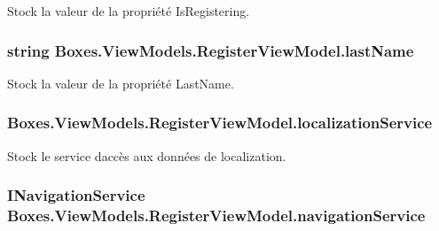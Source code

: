 Stock la valeur de la propriété {\ttfamily Is\+Registering}. 

\subsubsection[{\texorpdfstring{last\+Name}{lastName}}]{\setlength{\rightskip}{0pt plus 5cm}string Boxes.\+View\+Models.\+Register\+View\+Model.\+last\+Name\hspace{0.3cm}{\ttfamily [private]}}\hypertarget{class_boxes_1_1_view_models_1_1_register_view_model_ac5c719764dfe7bd968a92f012ef5e4b7}{}\label{class_boxes_1_1_view_models_1_1_register_view_model_ac5c719764dfe7bd968a92f012ef5e4b7}


Stock la valeur de la propriété {\ttfamily Last\+Name}. 

\subsubsection[{\texorpdfstring{localization\+Service}{localizationService}}]{ Boxes.\+View\+Models.\+Register\+View\+Model.\+localization\+Service\hspace{0.3cm}{\ttfamily [private]}}\hypertarget{class_boxes_1_1_view_models_1_1_register_view_model_a7ebf08d118dd2ad8ef90d36373b1185f}{}\label{class_boxes_1_1_view_models_1_1_register_view_model_a7ebf08d118dd2ad8ef90d36373b1185f}


Stock le service d\textquotesingle{}accès aux données de localization. 

\subsubsection[{\texorpdfstring{navigation\+Service}{navigationService}}]{\setlength{\rightskip}{0pt plus 5cm}I\+Navigation\+Service Boxes.\+View\+Models.\+Register\+View\+Model.\+navigation\+Service\hspace{0.3cm}{\ttfamily [private]}}\hypertarget{class_boxes_1_1_view_models_1_1_register_view_model_afcceb72df99eab11056fff6f93847e17}{}\label{class_boxes_1_1_view_models_1_1_register_view_model_afcceb72df99eab11056fff6f93847e17}


